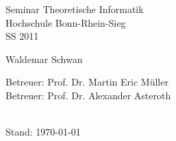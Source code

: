 
\begin{titlepage}
	
	\vspace*{0.8cm}
	
	\begin{center}
		\begin{Huge}
			\MMLn
		\end{Huge}
	\end{center}
	
	\vspace*{2cm}
	
	\begin{center}
		\begin{Large}
			Seminar Theoretische Informatik\\
			Hochschule Bonn-Rhein-Sieg\\
			SS 2011
		\end{Large}			
	\end{center}

	\vspace*{3.5cm}
	
	\begin{center}
		\begin{Large}
			Waldemar Schwan 
		\end{Large}			
	\end{center}
	\vspace*{4.5cm}
	\begin{large}
		Betreuer: Prof. Dr. Martin Eric Müller \\
		Betreuer: Prof. Dr. Alexander Asteroth \\
	\end{large}
	\\
	Stand: \today
\end{titlepage}